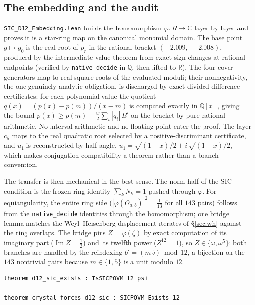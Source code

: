 \documentclass[12pt,a4paper]{article}
\begin{document}
\subsection{The embedding and the audit}
\label{subsec:audit}

\texttt{SIC\_D12\_Embedding.lean} builds the homomorphism
$\varphi : R \to \mathbb{C}$ layer by layer and proves it is a star-ring map
on the canonical monomial domain.  The base point $g \mapsto g_0$ is the
real root of $p_r$ in the rational bracket $(-2.009,\,-2.008)$, produced by
the intermediate value theorem from exact sign changes at rational
endpoints (verified by \texttt{native\_decide} in $\mathbb{Q}$, then lifted
to $\mathbb{R}$).  The four cover generators map to real square roots of the
evaluated moduli; their nonnegativity, the one genuinely analytic
obligation, is discharged by exact divided-difference certificates: for
each polynomial value the quotient $q(x) = (p(x)-p(m))/(x-m)$ is computed
exactly in $\mathbb{Q}[x]$, giving the bound
$p(x) \ge p(m) - \tfrac{w}{2}\sum_i |q_i|\,B^i$ on the bracket by pure
rational arithmetic.  No interval arithmetic and no floating point enter
the proof.  The layer $c_5$ maps to the real quadratic root selected by a
positive-discriminant certificate, and $u_1$ is reconstructed by half-angle,
$u_1 = \sqrt{(1+x)/2} + i\,\sqrt{(1-x)/2}$, which makes conjugation
compatibility a theorem rather than a branch convention.

The transfer is then mechanical in the best sense.  The norm half of the
SIC condition is the frozen ring identity $\sum_k N_k = 1$ pushed through
$\varphi$.  For equiangularity, the entire ring side
($|\varphi(O_{a,b})|^2 = \tfrac{1}{13}$ for all $143$ pairs) follows from
the \texttt{native\_decide} identities through the homomorphism; one bridge
lemma matches the Weyl--Heisenberg displacement iterates of
\S\ref{sec:wh} against the ring overlaps.  The bridge pins
$Z = \varphi(\zeta)$ by exact computation of its imaginary part
($\operatorname{Im} Z = \tfrac12$) and its twelfth power ($Z^{12} = 1$), so
$Z \in \{\omega, \omega^5\}$; both branches are handled by the reindexing
$b' = (m\,b) \bmod 12$, a bijection on the $143$ nontrivial pairs because
$m \in \{1,5\}$ is a unit modulo $12$.

\begin{lstlisting}
theorem d12_sic_exists : IsSICPOVM 12 psi

theorem crystal_forces_d12_sic : SICPOVM_Exists 12
\end{lstlisting}
\end{document}
